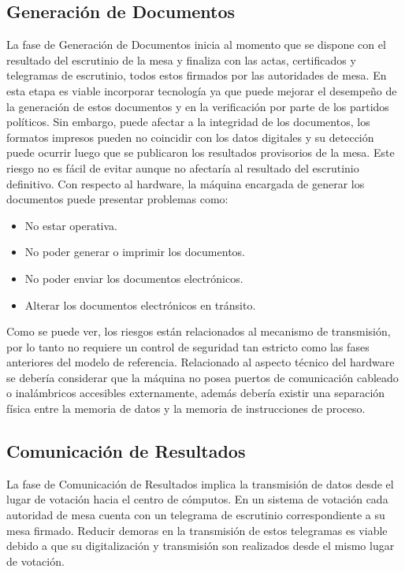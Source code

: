 \subsection{Generación de Documentos} 
La fase de Generación de Documentos inicia al momento que se dispone con el resultado del escrutinio de la mesa y finaliza con las actas, certificados y telegramas de escrutinio, todos estos firmados por las autoridades de mesa. En esta etapa es viable incorporar tecnología ya que puede mejorar el desempeño de la generación de estos documentos y en la verificación por parte de los partidos políticos. 
Sin embargo, puede afectar a la integridad de los documentos, los formatos impresos pueden no coincidir con los datos digitales y su detección puede ocurrir luego que se publicaron los resultados provisorios de la mesa. Este riesgo no es fácil de evitar aunque no afectaría al resultado del escrutinio definitivo. 
Con respecto al hardware, la máquina encargada de generar los documentos puede presentar problemas como: 
\begin{itemize}
    \item No estar operativa.
    \item No poder generar o imprimir los documentos.
    \item No poder enviar los documentos electrónicos.
    \item Alterar los documentos electrónicos en tránsito.
\end{itemize}
Como se puede ver, los riesgos están relacionados al mecanismo de transmisión, por lo tanto no requiere un control de seguridad tan estricto como las fases anteriores del modelo de referencia. Relacionado al aspecto técnico del hardware se debería considerar que la máquina no posea puertos de comunicación cableado o inalámbricos accesibles externamente, además debería existir una separación física entre la memoria de datos y la memoria de instrucciones de proceso. 

\subsection{Comunicación de Resultados}

La fase de Comunicación de Resultados implica la transmisión de datos desde el lugar de votación hacia el centro de cómputos. En un sistema de votación cada autoridad de mesa cuenta con un telegrama de escrutinio correspondiente a su mesa firmado. Reducir demoras en la transmisión de estos telegramas es viable debido a que su digitalización y transmisión son realizados desde el mismo lugar de votación. 


